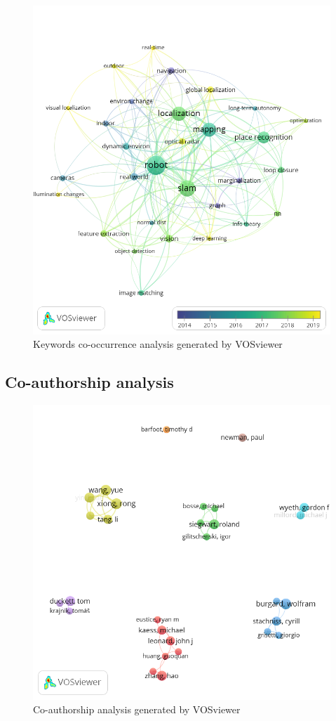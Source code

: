 \documentclass[10pt,a4paper,notitlepage,twocolumn,oneside]{article}
\begin{document}
\begin{figure}[!t]
  \centering
  \includegraphics[width=\columnwidth]{figures/kw.png}
  \caption{Keywords co-occurrence analysis generated by VOSviewer}
  \label{fig:results:kw}
\end{figure}

\subsection{Co-authorship analysis}

\begin{figure}[!t]
  \centering
  \includegraphics[width=\columnwidth]{figures/authors.png}
  \caption{Co-authorship analysis generated by VOSviewer}
  \label{fig:results:authors}
\end{figure}
\end{document}
